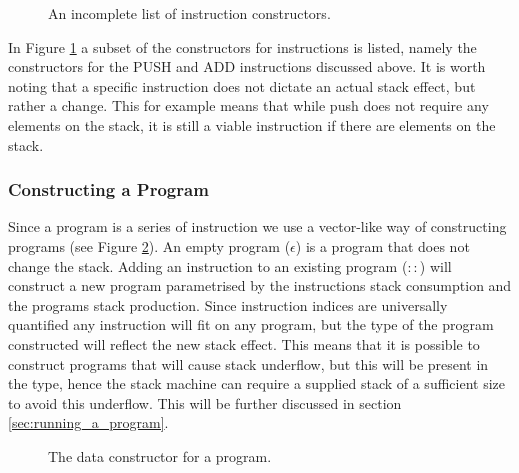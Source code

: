 \begin{figure}
\caption{An incomplete list of instruction constructors.}
\label{fig:inst_def}
\end{figure}

In Figure \ref{fig:inst_def} a subset of the constructors for instructions is listed, namely the constructors for the PUSH and ADD instructions discussed above. It is worth noting that a specific instruction does not dictate an actual stack effect, but rather a change. This for example means that while push does not require any elements on the stack, it is still a viable instruction if there are elements on the stack.

\subsubsection{Constructing a Program} 
Since a program is a series of instruction we use a vector-like way of constructing programs (see Figure \ref{fig:prog_def}). An empty program ($\epsilon$) is a program that does not change the stack. Adding an instruction to an existing program ($::$) will construct a new program parametrised by the instructions stack consumption and the programs stack production. Since instruction indices are universally quantified any instruction will fit on any program, but the type of the program constructed will reflect the new stack effect. This means that it is possible to construct programs that will cause stack underflow, but this will be present in the type, hence the stack machine can require a supplied stack of a sufficient size to avoid this underflow. This will be further discussed in section \ref{sec:running_a_program}.

\begin{figure}
\caption{The data constructor for a program.}
\label{fig:prog_def}
\end{figure}